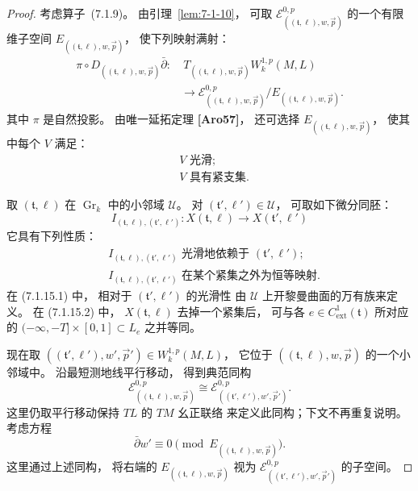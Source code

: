 \begin{proof}
考虑算子~(7.1.9)。
由引理~\ref{lem:7-1-10}，
可取
$\mathcal E^{0,p}_{((\mathfrak t,\ell),w,\vec p)}$
的一个有限维子空间
$E_{((\mathfrak t,\ell),w,\vec p)}$，
使下列映射满射：
\begin{equation}
\begin{aligned}
\pi\circ D_{((\mathfrak t,\ell),w,\vec p)}\bar\partial:
&\ T_{((\mathfrak t,\ell),w,\vec p)}W_k^{1,p}(M,L)\\
&\longrightarrow
\mathcal E^{0,p}_{((\mathfrak t,\ell),w,\vec p)}
/E_{((\mathfrak t,\ell),w,\vec p)}.
\end{aligned}
\tag{7.1.13}\label{eq:7-1-13}
\end{equation}
其中 $\pi$ 是自然投影。
由唯一延拓定理 \textbf{[Aro57]}，
还可选择 $E_{((\mathfrak t,\ell),w,\vec p)}$，
使其中每个 $V$ 满足：
\begin{align*}
&V\text{ 光滑};
  \tag{7.1.14.1}\label{eq:7-1-14-1}\\
&V\text{ 具有紧支集}.
  \tag{7.1.14.2}\label{eq:7-1-14-2}
\end{align*}

取 $(\mathfrak t,\ell)$ 在 $\operatorname{Gr}_k$
中的小邻域 $\mathcal U$。
对 $(\mathfrak t',\ell')\in\mathcal U$，
可取如下微分同胚：
\[
I_{(\mathfrak t,\ell),(\mathfrak t',\ell')}:
X(\mathfrak t,\ell)\longrightarrow X(\mathfrak t',\ell')
\]
它具有下列性质：
\begin{align*}
&I_{(\mathfrak t,\ell),(\mathfrak t',\ell')}
\text{ 光滑地依赖于 }(\mathfrak t',\ell');
\tag{7.1.15.1}\label{eq:7-1-15-1}\\
&I_{(\mathfrak t,\ell),(\mathfrak t',\ell')}
\text{ 在某个紧集之外为恒等映射}.
\tag{7.1.15.2}\label{eq:7-1-15-2}
\end{align*}
在 (7.1.15.1) 中，
相对于 $(\mathfrak t',\ell')$ 的光滑性
由 $\mathcal U$ 上开黎曼曲面的万有族来定义。
在 (7.1.15.2) 中，
$X(\mathfrak t,\ell)$ 去掉一个紧集后，
可与各 $e\in C^1_{\mathrm{ext}}(\mathfrak t)$
所对应的
$(-\infty,-T]\times[0,1]\subset L_e$
之并等同。

现在取
$((\mathfrak t',\ell'),w',\vec p')\in W_k^{1,p}(M,L)$，
它位于 $((\mathfrak t,\ell),w,\vec p)$ 的一个小邻域中。
沿最短测地线平行移动，
得到典范同构
\[
\mathcal E^{0,p}_{((\mathfrak t,\ell),w,\vec p)}
\cong
\mathcal E^{0,p}_{((\mathfrak t',\ell'),w',\vec p')}.
\]
这里仍取平行移动保持 $TL$ 的 $TM$ 幺正联络
来定义此同构；下文不再重复说明。
考虑方程
\begin{equation}
\bar\partial w'\equiv0
\pmod{E_{((\mathfrak t,\ell),w,\vec p)}}.
\tag{7.1.16}\label{eq:7-1-16}
\end{equation}
这里通过上述同构，
将右端的 $E_{((\mathfrak t,\ell),w,\vec p)}$
视为
$\mathcal E^{0,p}_{((\mathfrak t',\ell'),w',\vec p')}$
的子空间。


\end{proof}
